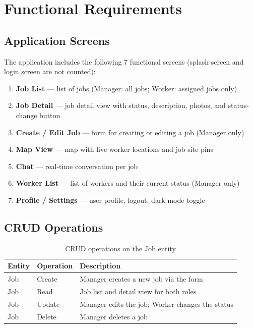 \chapter{Functional Requirements}

\section{Application Screens}

The application includes the following 7 functional screens (splash screen and login screen are not counted):

\begin{enumerate}
  \item \textbf{Job List} --- list of jobs (Manager: all jobs; Worker: assigned jobs only)
  \item \textbf{Job Detail} --- job detail view with status, description, photos, and status-change button
  \item \textbf{Create / Edit Job} --- form for creating or editing a job (Manager only)
  \item \textbf{Map View} --- map with live worker locations and job site pins
  \item \textbf{Chat} --- real-time conversation per job
  \item \textbf{Worker List} --- list of workers and their current status (Manager only)
  \item \textbf{Profile / Settings} --- user profile, logout, dark mode toggle
\end{enumerate}

\section{CRUD Operations}

\begin{table}[H]
  \centering
  \begin{tabularx}{\textwidth}{llX}
    \toprule
    \textbf{Entity} & \textbf{Operation} & \textbf{Description} \\
    \midrule
    Job & Create & Manager creates a new job via the form \\
    Job & Read   & Job list and detail view for both roles \\
    Job & Update & Manager edits the job; Worker changes the status \\
    Job & Delete & Manager deletes a job \\
    \bottomrule
  \end{tabularx}
  \caption{CRUD operations on the Job entity}
\end{table}

